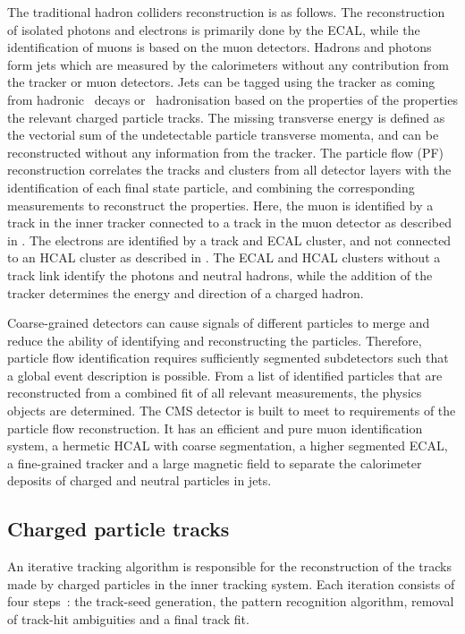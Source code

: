 The traditional hadron colliders reconstruction is as follows. The reconstruction of isolated photons and electrons is primarily done by the ECAL, while the identification of muons is based on the muon detectors. Hadrons and photons form jets which are measured by the calorimeters without any contribution from the tracker or muon detectors. Jets can be tagged using the tracker as coming from hadronic \Ptau\ decays or \Pbottom\ hadronisation based on the properties of the properties the relevant charged particle tracks. The missing transverse energy is defined as the vectorial sum of the undetectable particle transverse momenta, and can be reconstructed without any information from the tracker. 
The particle flow (PF)~\cite{CMS-PRF-14-001} reconstruction correlates the tracks and clusters from all detector layers with the identification of each final state particle, and combining the corresponding measurements to reconstruct the properties. Here, the muon is identified by a track in the inner tracker connected to a track in the muon detector as described in . The electrons are identified by a track and ECAL cluster, and not connected to an HCAL cluster as described in . The ECAL and HCAL clusters without a track link identify the photons and neutral hadrons, while the addition of the tracker determines the energy and direction of a charged hadron. 


Coarse-grained detectors can cause signals of different particles to merge and reduce the ability of identifying and reconstructing the particles. Therefore, particle flow identification requires sufficiently segmented subdetectors such that a global event description is possible. From a list of identified particles that are reconstructed from a combined fit of all relevant measurements, the physics objects are determined. The CMS detector is built to meet to requirements of the particle flow reconstruction. It has an efficient and pure muon identification system, a hermetic HCAL with coarse segmentation, a higher segmented ECAL, a fine-grained tracker and a large magnetic field to separate the calorimeter deposits of charged and neutral particles in jets. 

\subsection{Charged particle tracks}
An iterative tracking algorithm is responsible for the reconstruction of the tracks made by charged particles in the inner tracking system. Each iteration consists of four steps~\cite{Bayatian:922757}: the track-seed generation, the pattern recognition algorithm, removal of track-hit ambiguities and a final track fit. 

